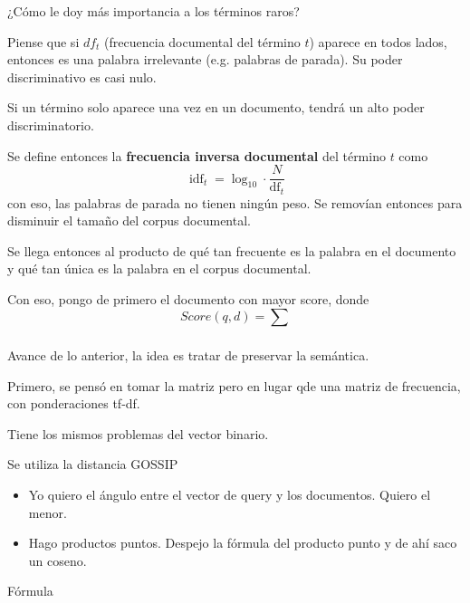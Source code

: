 \documentclass{fmbnotes}
\begin{document}
\label{sec:discriminancia}

¿Cómo le doy más importancia a los términos raros?

Piense que si \(df_t\) (frecuencia documental del término \(t\)) aparece en todos lados, entonces es una palabra irrelevante (e.g. palabras de parada). Su poder discriminativo es casi nulo.

Si un término solo aparece una vez en un documento, tendrá un alto poder discriminatorio. 

Se define entonces la \textbf{frecuencia inversa documental} del término \(t\) como 
\begin{equation*}
    \operatorname{idf}_t = \log_{10} \cdot \frac{N}{\operatorname{df}_t}
\end{equation*}
con eso, las palabras de parada no tienen ningún peso. Se removían entonces para disminuir el tamaño del corpus documental.

\label{sec:tf_df_textit_term_frequency_inverse_document_frequency_}

Se llega entonces al producto de qué tan frecuente es la palabra en el documento y qué tan única es la palabra en el corpus documental. 


Con eso, pongo de primero el documento con mayor score, donde 
\begin{equation*}
    Score(q,d) = \sum_{}
\end{equation*}

\label{sec:documentos_como_vectores}
Avance de lo anterior, la idea es tratar de preservar la semántica.

\label{sec:representacion_vectorial_con_base_en_tf_df}
Primero, se pensó en tomar la matriz pero en lugar qde una matriz de frecuencia, con ponderaciones tf-df.

Tiene los mismos problemas del vector binario.

Se utiliza la distancia GOSSIP

\begin{itemize}
    \item Yo quiero el ángulo entre el vector de query y los documentos. Quiero el menor.
    \item Hago productos puntos. Despejo la fórmula del producto punto y de ahí saco un coseno.
\end{itemize}
Fórmula


\label{sec:modelos_de_lenguaje_n_ramas}
\label{sec:clasificacion_de_texto_regresion_logistica_}
\label{sec:incrustaciones_de_palabras}
\label{sec:redes_neuronales}
\label{sec:incrustaciones_contextuales}
\label{sec:grandes_modelos_de_lenguajes_aplicaciones}
\end{document}
